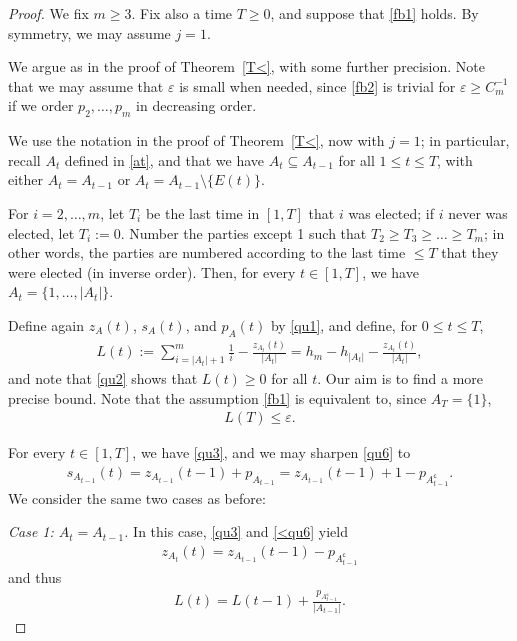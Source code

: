 \documentclass[11pt,reqno,tbtags,a4paper]{amsart}
\numberwithin{equation}{section}
\renewcommand\le{\leq}
\renewcommand\ge{\geq}
\renewcommand\leq{\leqslant}
\renewcommand\geq{\geqslant}
\theoremstyle{plain}%
\theoremstyle{definition}
\theoremstyle{remark}
\newcounter{cases}
\newcommand\pfcase[2]{\smallskip\noindent\emph{Case #1: #2} \noindent}
\newcommand{\refT}[1]{Theorem~\ref{#1}}
\newcommand\set[1]{\ensuremath{\{#1\}}}
\newcounter{cc}
\newcommand\eps{\varepsilon}
\newcommand\qw{^{-1}}
\newcommand\cp{^{\mathsf c}}
\newcommand\0{{\boldsymbol 0}}
\newcommand\1{{\boldsymbol 1}}
\begin{document}
\begin{proof}
We fix $m\ge3$.
Fix also a time $T\ge0$, and suppose that \eqref{fb1} holds.
By symmetry, we may assume $j=1$.

We argue as in the proof of \refT{T<}, with some further precision.
Note that we may assume that $\eps$ is small when needed, 
since \eqref{fb2} is trivial for $\eps\ge C_m\qw$
if  we order $p_2,\dots,p_m$ in decreasing order.

We use the notation in the proof of \refT{T<}, now with $j=1$; 
in particular, recall $A_t$ defined in \eqref{at}, and
%
%
%
%
%
%
%
that we have $A_{t}\subseteq A_{t-1}$ for all $1\le t \le T$, with
either $A_{t}=A_{t-1}$ or $A_{t}=A_{t-1}\setminus\set{E(t)}$.

For $i=2,\dots,m$, let $T_i$ be the last time in $[1,T]$ that $i$ was
elected; if $i$ never was elected, let $T_i:=0$.
Number the parties except 1 such that $T_2\ge T_3\ge\dots\ge T_m$;
%
in other words, the parties are numbered according to the last time $\le T$
that they were elected (in inverse order).
Then, for every $t\in[1,T]$, we have $A_t=\set{1,\dots,|A_t|}$. 

Define again $z_A(t)$, $s_A(t)$, and $p_A(t)$ by \eqref{qu1},
%
and define, for $0\le t\le T$,
\begin{align}\label{<qu2}
L(t):=
  \sum_{i=|A_t|+1}^m\frac{1}{i}-  \frac{z_{A_t}(t)}{|A_t|}
= h_m - h_{|A_t|}-  \frac{z_{A_t}(t)}{|A_t|}
,
\end{align}
and note that \eqref{qu2} shows that $L(t)\ge0$ for all $t$.
Our aim is to find a more precise bound.
Note that the assumption \eqref{fb1} is equivalent to, since $A_T=\set1$,
\begin{align}\label{fb6}
  L(T) \le \eps.
\end{align}

 For every $t\in[1,T]$, we have \eqref{qu3}, and we may sharpen
\eqref{qu6} to
\begin{align} \label{<qu6}
 s_{A_{t-1}}(t)
= z_{A_{t-1}}(t-1)+ p_{A_{t-1}}
= z_{A_{t-1}}(t-1)+1-p_{A\cp_{t-1}}
.\end{align}
We consider the same two cases as before:

\pfcase1{$A_t=A_{t-1}$.}
In this case, \eqref{qu3} and \eqref{<qu6} yield
\begin{align} \label{fb3}
 z_{A_{t}}(t)
= z_{A_{t-1}}(t-1)-p_{A\cp_{t-1}}
\end{align}
and thus
\begin{align}\label{fb4}
  L(t)=L(t-1)+\frac{p_{A\cp_{t-1}}}{|A_{t-1}|}
.\end{align}


\end{proof}
\end{document}
